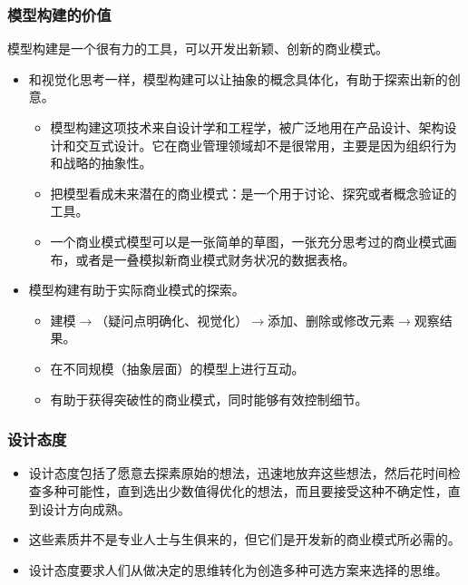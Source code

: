 \subsubsection{模型构建的价值}
模型构建是一个很有力的工具，可以开发出新颖、创新的商业模式。
\begin{itemize}
    \item 和视觉化思考一样，模型构建可以让抽象的概念具体化，有助于探索出新的创意。
    \begin{itemize}
        \item 模型构建这项技术来自设计学和工程学，被广泛地用在产品设计、架构设计和交互式设计。它在商业管理领域却不是很常用，主要是因为组织行为和战略的抽象性。
        \item 把模型看成未来潜在的商业模式：是一个用于讨论、探究或者概念验证的工具。
        \item 一个商业模式模型可以是一张简单的草图，一张充分思考过的商业模式画布，或者是一叠模拟新商业模式财务状况的数据表格。
    \end{itemize}
    \item 模型构建有助于实际商业模式的探索。
    \begin{itemize}
        \item 建模$\rightarrow$（疑问点明确化、视觉化）$\rightarrow$添加、删除或修改元素$\rightarrow$观察结果。
        \item 在不同规模（抽象层面）的模型上进行互动。
        \item 有助于获得突破性的商业模式，同时能够有效控制细节。
    \end{itemize}
\end{itemize}

\subsubsection{设计态度}
\begin{itemize}
    \item 设计态度包括了愿意去探素原始的想法，迅速地放弃这些想法，然后花时间检查多种可能性，直到选出少数值得优化的想法，而且要接受这种不确定性，直到设计方向成熟。
    \item 这些素质井不是专业人士与生俱来的，但它们是开发新的商业模式所必需的。
    \item 设计态度要求人们从做决定的思维转化为创造多种可选方案来选择的思维。
\end{itemize}

